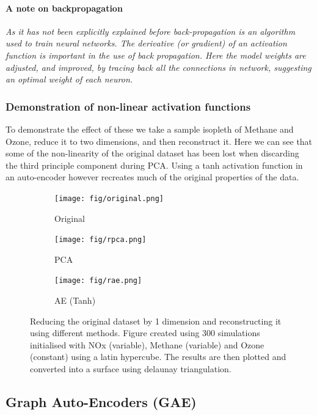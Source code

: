 \documentclass{pasa}%
\begin{document}
\paragraph{\textbf{A note on backpropagation}}
\emph{As it has not been explicitly explained before back-propagation is an algorithm used to train neural networks. The derivative (or gradient) of an activation function is important in the use of back propagation. Here the model weights are adjusted, and improved, by tracing back all the connections in network, suggesting an optimal weight of each neuron.} 

\subsubsection{Demonstration of non-linear activation functions}

To demonstrate the effect of these we take a sample isopleth of Methane and Ozone, reduce it to two dimensions, and then reconstruct it. Here we can see that some of the non-linearity of the original dataset has been lost when discarding the third principle component during PCA. Using a tanh activation function in an auto-encoder however recreates much of the original properties of the data. 


\begin{figure}[H]

\begin{subfigure}{.33\textwidth}
  \centering
  \texttt{[image: fig/original.png]}
  \label{fig:orig}
  \caption{Original}
\end{subfigure}%
\begin{subfigure}{.33\textwidth}
  \centering
  \texttt{[image: fig/rpca.png]}
  \label{fig:pca}
  \caption{PCA}
\end{subfigure}%
\begin{subfigure}{.33\textwidth}
  \centering
  \texttt{[image: fig/rae.png]}
  \label{fig:ae}
  \caption{AE (Tanh)}
\end{subfigure}%


\caption{Reducing the original dataset by 1 dimension and reconstructing it using different methods. Figure created using 300 simulations initialised with NOx (variable), Methane (variable) and Ozone (constant) using a latin hypercube. The results are then plotted and converted into a surface using delaunay triangulation. }
\end{figure}


\subsection{Graph Auto-Encoders (GAE)}
\end{document}
